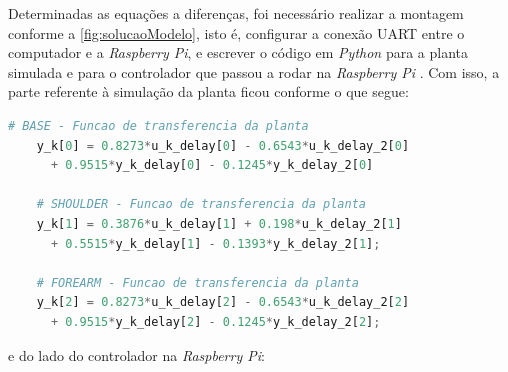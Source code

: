 % 

Determinadas as equações a diferenças, foi necessário realizar a montagem conforme a 
\autoref{fig:solucaoModelo}, isto é, configurar a conexão UART entre o computador e a 
\textit{Raspberry Pi}, e escrever o código em \textit{Python} para a planta simulada e
para o controlador que passou a rodar na \textit{Raspberry Pi} \cite{lelis_hil2}. Com isso,
a parte referente à simulação da planta ficou conforme o que segue: \\

\begin{lstlisting}[language=Python]
	# BASE - Funcao de transferencia da planta
	y_k[0] = 0.8273*u_k_delay[0] - 0.6543*u_k_delay_2[0]
	  + 0.9515*y_k_delay[0] - 0.1245*y_k_delay_2[0]

	# SHOULDER - Funcao de transferencia da planta
	y_k[1] = 0.3876*u_k_delay[1] + 0.198*u_k_delay_2[1]
	  + 0.5515*y_k_delay[1] - 0.1393*y_k_delay_2[1];

	# FOREARM - Funcao de transferencia da planta
	y_k[2] = 0.8273*u_k_delay[2] - 0.6543*u_k_delay_2[2]
	  + 0.9515*y_k_delay[2] - 0.1245*y_k_delay_2[2];
\end{lstlisting}
e do lado do controlador na \textit{Raspberry Pi}: \\

